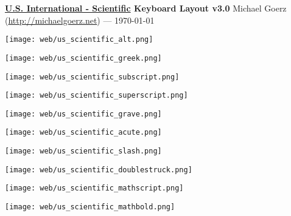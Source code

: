 \documentclass[letter,10pt]{article}
\title{\Title}
\author{\Author}
\date{\today}
\begin{document}
\begin{center}
  \textbf{\underline{U.S. International - Scientific} Keyboard Layout v3.0} \hfill Michael Goerz (\url{http://michaelgoerz.net}) — \today
\end{center}

\texttt{[image: web/us\_scientific\_alt.png]}

\vspace{2mm}

\texttt{[image: web/us\_scientific\_greek.png]}

\vspace{2mm}

\texttt{[image: web/us\_scientific\_subscript.png]}

\vspace{2mm}

\texttt{[image: web/us\_scientific\_superscript.png]}

\vspace{2mm}

\texttt{[image: web/us\_scientific\_grave.png]}

\vspace{2mm}

\texttt{[image: web/us\_scientific\_acute.png]}

\vspace{2mm}

\texttt{[image: web/us\_scientific\_slash.png]}

\newpage

\texttt{[image: web/us\_scientific\_doublestruck.png]}

\vspace{2mm}

\texttt{[image: web/us\_scientific\_mathscript.png]}

\vspace{2mm}

\texttt{[image: web/us\_scientific\_mathbold.png]}
\end{document}
